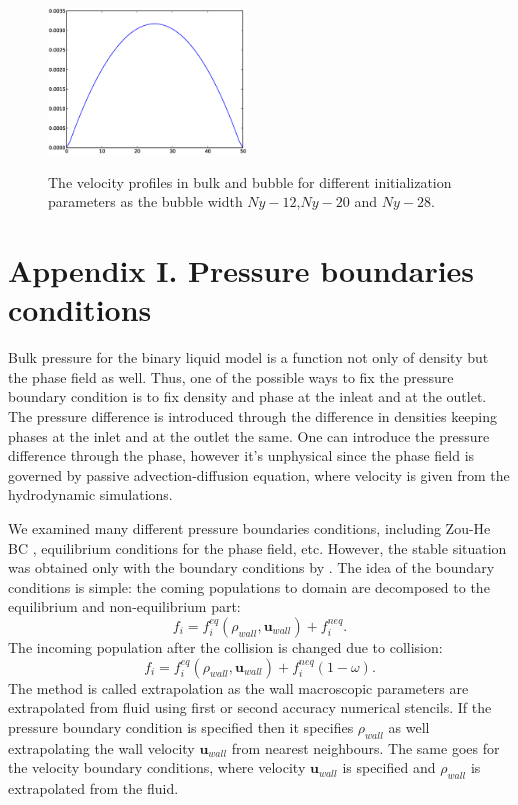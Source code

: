 \documentclass{article}
\begin{document}
\begin{figure}
\hfill
\includegraphics[width=0.47\textwidth]{Figures/vel_bulk_pressure_width_14.eps}\\
\caption{The velocity profiles in bulk and bubble for different initialization
parameters as the
bubble width $Ny-12$,$Ny-20$ and $Ny-28$.
\label{fig:velocity:profiles:different:widths:pressure}}
\end{figure}



\section{Appendix I. Pressure boundaries conditions}
\label{appendix-pressure}
Bulk pressure for the binary liquid model is a function not only of density
but the phase field as well. Thus, one of the possible ways to fix the pressure
boundary condition is to fix density and phase at the inleat and at the outlet.
The pressure difference is introduced through the difference in densities
keeping phases at the inlet and at the outlet the same. One can introduce the
pressure difference through the phase, however it's unphysical since the phase
field is governed by passive advection-diffusion equation, where velocity is
given from the hydrodynamic simulations.

We examined many different pressure boundaries conditions, including Zou-He BC
\cite{zouhe-boundary,harting-pressure}, equilibrium conditions for
the phase field, etc. However, the stable situation was obtained only with the
boundary conditions by \citeauthor{guo-pressure} \cite{guo-pressure,
guo-boundary-conditions}. The idea of the boundary conditions is simple: the
coming populations to domain are decomposed to the equilibrium and
non-equilibrium part:
\begin{equation}
f_i=f_i^{eq}(\rho_{wall},\bm{u}_{wall})+f_i^{neq}.
\end{equation}
The incoming population after the collision is changed due to collision:
\begin{equation}
f_i=f_i^{eq}(\rho_{wall},\bm{u}_{wall})+f_i^{neq} (1-\omega).
\end{equation}
The method is called extrapolation as the wall macroscopic parameters are
extrapolated from fluid using first or second accuracy numerical stencils. If
the pressure boundary condition is specified then it specifies $\rho_{wall}$ as
well extrapolating the wall velocity $\bm{u}_{wall}$ from nearest neighbours.
The same goes for the velocity boundary conditions, where velocity
$\bm{u}_{wall}$ is specified and $\rho_{wall}$ is extrapolated from the fluid.
\end{document}
